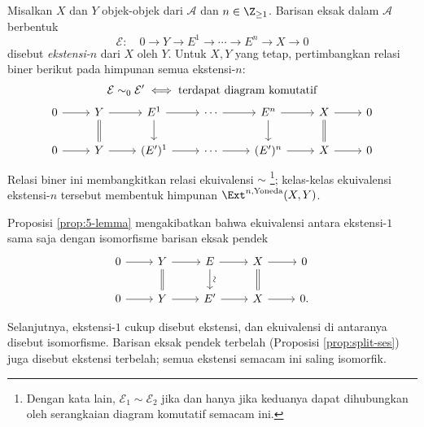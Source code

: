 \begin{definisi}\label{def:Yoneda-Ext}
	Misalkan $X$ dan $Y$ objek-objek dari $\mathcal{A}$ dan
	$n \in \Z_{\geq 1}$. Barisan eksak dalam $\mathcal{A}$ berbentuk
	\[ \mathcal{E}: \quad 0 \to Y \to E^1 \to \cdots \to E^n \to X \to 0 \]
	disebut \emph{ekstensi-$n$} dari $X$ oleh $Y$. Untuk $X,Y$ yang tetap,
	pertimbangkan relasi biner berikut pada himpunan semua ekstensi-$n$:
	\begin{multline*} \mathcal{E} \sim_0 \mathcal{E}' \iff \text{terdapat diagram komutatif} \\
		\begin{tikzcd}[ampersand replacement=\&]
			0 \arrow[r] \& Y \arrow[r] \arrow[equal, d] \& E^1 \arrow[r] \arrow[d] \& \cdots \arrow[r] \& E^n \arrow[d] \arrow[r] \& X \arrow[equal, d] \arrow[r] \& 0 \\
			0 \arrow[r] \& Y \arrow[r] \& (E')^1 \arrow[r] \& \cdots \arrow[r] \& (E')^n \arrow[r] \& X \arrow[r] \& 0
	\end{tikzcd}\end{multline*}
	Relasi biner ini membangkitkan relasi ekuivalensi $\sim$
	\footnote{Dengan kata lain, $\mathcal{E}_1 \sim \mathcal{E}_2$ jika dan
	hanya jika keduanya dapat dihubungkan oleh serangkaian diagram komutatif
	semacam ini.}; kelas-kelas ekuivalensi ekstensi-$n$ tersebut membentuk
	himpunan $\Ext^{n, \text{Yoneda}}(X, Y)$.
\end{definisi}

Proposisi \ref{prop:5-lemma} mengakibatkan bahwa ekuivalensi antara
ekstensi-$1$ sama saja dengan isomorfisme barisan eksak pendek
\[\begin{tikzcd}
	0 \arrow[r] & Y \arrow[r] \arrow[equal, d] & E \arrow[r] \arrow[d, "\sim" sloped] & X \arrow[equal, d] \arrow[r] & 0 \\
	0 \arrow[r] & Y \arrow[r] & E' \arrow[r] & X \arrow[r] & 0 .
\end{tikzcd}\]

\begin{konvensi}
	Selanjutnya, ekstensi-$1$ cukup disebut ekstensi, dan ekuivalensi di
	antaranya disebut isomorfisme. Barisan eksak pendek terbelah (Proposisi
	\ref{prop:split-ses}) juga disebut ekstensi terbelah; semua ekstensi semacam
	ini saling isomorfik.
\end{konvensi}

